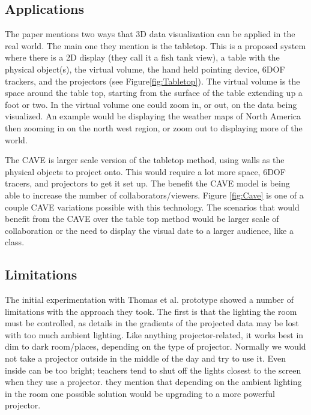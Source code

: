 \documentclass{sig-alternate}
\begin{document}
\subsection{Applications}
\label{sec:Applications}
The paper mentions two ways that 3D data visualization can be applied in the real world. The main one they mention is the tabletop. This is a proposed system where there is a 2D display (they call it a fish tank view), a table with the physical object(s), the virtual volume, the hand held pointing device, 6DOF trackers, and the projectors (see Figure\ref{fig:Tabletop}). The virtual volume is the space around the table top, starting from the surface of the table extending up a foot or two. In the virtual volume one could zoom in, or out, on the data being visualized. An example would be displaying the weather maps of North America then zooming in on the north west region, or zoom out to displaying more of the world.  

The CAVE is larger scale version of the tabletop method, using walls as the physical objects to project onto. This would require a lot more space, 6DOF tracers, and projectors to get it set up. The benefit the CAVE model is being able to increase the number of collaborators/viewers. Figure \ref{fig:Cave} is one of a couple CAVE variations possible with this technology. The scenarios that would benefit from the CAVE over the table top method would be larger scale of collaboration or the need to display the visual date to a larger audience, like a class.

\subsection{Limitations}
\label{sec:Limitations}
The initial experimentation with Thomas et al. \cite{3D} prototype showed a number of limitations with the approach they took. The first is that the lighting the room must be controlled, as details in the gradients of the projected data may be lost with too much ambient lighting. Like anything projector-related, it works best in dim to dark room/places, depending on the type of projector. Normally we would not take a projector outside in the middle of the day and try to use it. Even inside can be too bright; teachers tend to shut off the lights closest to the screen when they use a projector. they mention that depending on the ambient lighting in the room one possible solution would be upgrading to a more powerful projector. 
\end{document}
